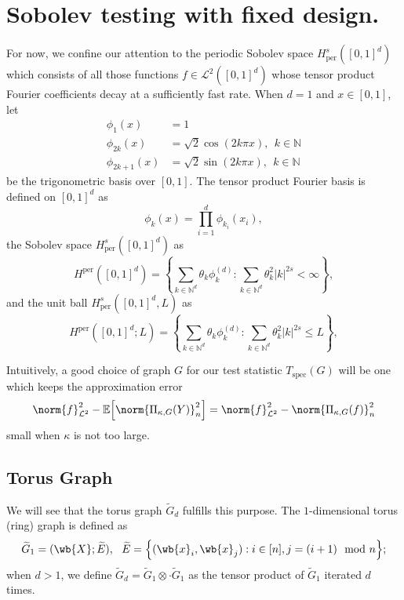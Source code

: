 \documentclass{article}
\newcommand{\abs}[1]{\left \lvert #1 \right \rvert}
\newcommand{\set}[1]{\left\{#1\right\}}
\newcommand{\1}{\mathbf{1}}
\newcommand{\Leb}{\mathcal{L}}
\newcommand{\Ebb}{\mathbb{E}}
\newcommand{\wt}[1]{\widetilde{#1}}
\newcommand{\spec}{\mathrm{spec}}
\theoremstyle{alden}
\theoremstyle{aldenthm}
\theoremstyle{definition}
\theoremstyle{remark}
\begin{document}
\section{Sobolev testing with fixed design.}
For now, we confine our attention to the periodic Sobolev space $H_{\textrm{per}}^{s}([0,1]^d)$ which consists of all those functions $f \in \Leb^2([0,1]^d)$ whose tensor product Fourier coefficients decay at a sufficiently fast rate. When $d = 1$ and $x \in [0,1]$, let
\begin{align*}
\phi_1(x) & = 1 \\
\phi_{2k}(x) & = \sqrt{2}\cos(2k\pi x),~~ k \in \mathbb{N} \\
\phi_{2k + 1}(x) & = \sqrt{2}\sin(2k\pi x),~~ k \in \mathbb{N}
\end{align*}
be the trigonometric basis over $[0,1]$. The tensor product Fourier basis is defined on $[0,1]^d$ as
\begin{equation*}
\phi_k(x) = \prod_{i = 1}^{d} \phi_{k_i}(x_i),
\end{equation*}
the Sobolev space $H_{\textrm{per}}^{s}([0,1]^d)$ as 
\begin{equation*}
H^{\textrm{per}}([0,1]^d) = \set{\sum_{k \in \mathbb{N}^d} \theta_k \phi_k^{(d)}: \sum_{k \in \mathbb{N}^d} \theta_k^2 \abs{k}^{2s} < \infty},
\end{equation*}
and the unit ball $H_{\textrm{per}}^{s}([0,1]^d, L)$ as 
\begin{equation*}
H^{\textrm{per}}([0,1]^d;L) = \set{\sum_{k \in \mathbb{N}^d} \theta_k \phi_k^{(d)}: \sum_{k \in \mathbb{N}^d} \theta_k^2 \abs{k}^{2s} \leq L},
\end{equation*}

Intuitively, a good choice of graph $G$ for our test statistic $T_{\spec}(G)$ will be one which keeps the approximation error
\begin{equation*}
\norm{f}_{\Leb^2}^2 - \Ebb\Bigl[\norm{\Pi_{\kappa,G}(Y)}_{n}^2\Bigr] =  \norm{f}_{\Leb^2}^2 - \norm{\Pi_{\kappa,G}(f)}_{n}^2
\end{equation*}
small when $\kappa$ is not too large.

\subsection{Torus Graph}

We will see that the torus graph $\wt{G}_d$ fulfills this purpose. The $1$-dimensional torus (ring) graph is defined as
\begin{equation*}
\wt{G}_1 = (\wb{X}; \wt{E}),~~ \wt{E} = \Bigl\{(\wb{x}_i,\wb{x}_j): i \in [n], j = (i + 1) \mod n\Bigr\};
\end{equation*}
when $d > 1$, we define $\wt{G}_d = \wt{G}_1 \otimes \cdot \wt{G}_1$ as the tensor product of $\wt{G}_1$ iterated $d$ times.
\end{document}
